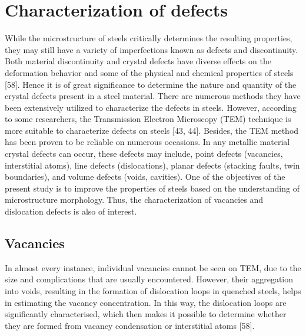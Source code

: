 \documentclass[12pt]{report}
\begin{document}

\section{Characterization of defects} 
While the microstructure of steels critically determines the resulting properties, they may still have a variety of imperfections known as defects and discontinuity. Both material discontinuity and crystal defects have diverse effects on the deformation behavior and some of the physical and chemical properties of steels [58]. Hence it is of great significance to determine the nature and quantity of the crystal defects present in a steel material. 
There are numerous methods they have been extensively utilized to characterize the defects in steels. However, according to some researchers, the Transmission Electron Microscopy (TEM) technique is more suitable to characterize defects on steels [43, 44]. Besides, the TEM method has been proven to be reliable on numerous occasions. In any metallic material crystal defects can occur, these defects may include, point defects (vacancies, interstitial atoms), line defects (dislocations), planar defects (stacking faults, twin boundaries), and volume defects (voids, cavities). One of the objectives of the present study is to improve the properties of steels based on the understanding of microstructure morphology. Thus, the characterization of vacancies and dislocation defects is also of interest.

\subsection{Vacancies} 
 In almost every instance, individual vacancies cannot be seen on TEM, due to the size and complications that are usually encountered. However, their aggregation into voids, resulting in the formation of dislocation loops in quenched steels, helps in estimating the vacancy concentration. In this way, the dislocation loops are significantly characterised, which then makes it possible to determine whether they are formed from vacancy condensation or interstitial atoms [58].
\end{document}
